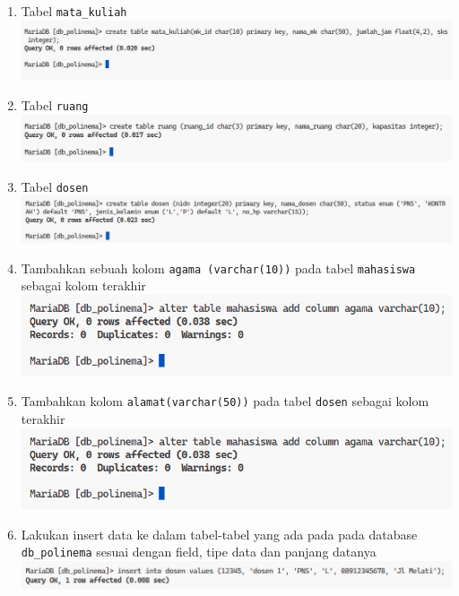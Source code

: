 \documentclass[12pt,titlepage]{article}
\begin{document}
\begin{enumerate}
{    }
    \item {
        Tabel \texttt{mata\_kuliah}\\
        \includegraphics[width=.8\textwidth]{./images/practicum-5.png}
    }
    \item {
        Tabel \texttt{ruang}\\
        \includegraphics[width=.8\textwidth]{./images/practicum-6.png}
    }
    \item {
        Tabel \texttt{dosen}\\
        \includegraphics[width=.8\textwidth]{./images/practicum-7.png}
    }
    \item {
        Tambahkan sebuah kolom \texttt{agama (varchar(10))} pada tabel \texttt{mahasiswa} sebagai kolom terakhir\\
        \includegraphics[width=.8\textwidth]{./images/practicum-8.png}
    }
    \item {
        Tambahkan kolom \texttt{alamat(varchar(50))} pada tabel \texttt{dosen} sebagai kolom terakhir\\
        \includegraphics[width=.8\textwidth]{./images/practicum-8.png}
    }
    \item {
        Lakukan insert data ke dalam tabel-tabel yang ada pada pada database\\
        \texttt{db\_polinema} sesuai dengan field, tipe data dan panjang datanya\\
        \includegraphics[width=.8\textwidth]{./images/practicum-10a.png}\\
}
\end{enumerate}
\end{document}
